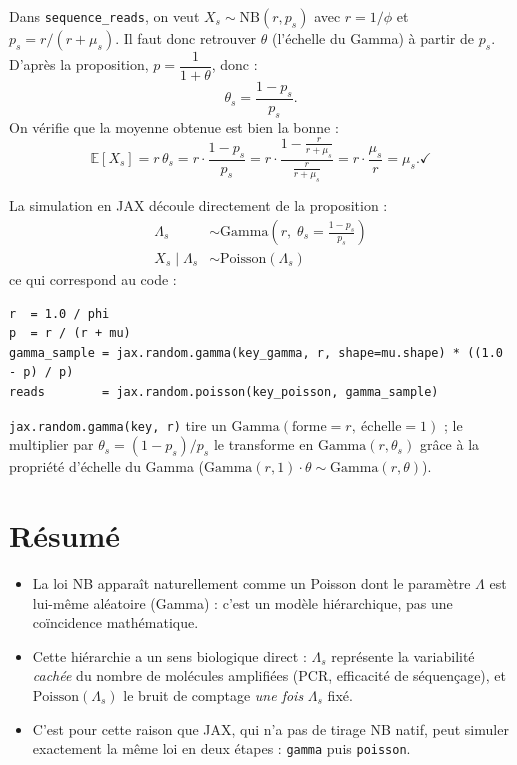 \documentclass[11pt]{article}
\begin{document}
Dans \texttt{sequence\_reads}, on veut $X_s \sim \mathrm{NB}(r, p_s)$ avec $r = 1/\phi$ et
$p_s = r/(r+\mu_s)$. Il faut donc retrouver $\theta$ (l'échelle du Gamma) à partir de $p_s$.
D'après la proposition, $p = \dfrac{1}{1+\theta}$, donc :
\[
  \theta_s = \frac{1-p_s}{p_s}.
\]
On vérifie que la moyenne obtenue est bien la bonne :
\[
  \mathbb{E}[X_s] = r\,\theta_s = r \cdot \frac{1-p_s}{p_s} = r \cdot \frac{1 - \frac{r}{r+\mu_s}}{\frac{r}{r+\mu_s}}
  = r \cdot \frac{\mu_s}{r} = \mu_s. \checkmark
\]

La simulation en JAX découle directement de la proposition :
\begin{align*}
  \Lambda_s &\sim \mathrm{Gamma}\!\left(r,\; \theta_s = \frac{1-p_s}{p_s}\right) \\
  X_s \mid \Lambda_s &\sim \mathrm{Poisson}(\Lambda_s)
\end{align*}
ce qui correspond au code :
\begin{verbatim}
r  = 1.0 / phi
p  = r / (r + mu)
gamma_sample = jax.random.gamma(key_gamma, r, shape=mu.shape) * ((1.0 - p) / p)
reads        = jax.random.poisson(key_poisson, gamma_sample)
\end{verbatim}
\texttt{jax.random.gamma(key, r)} tire un $\mathrm{Gamma}(\text{forme}=r,\ \text{échelle}=1)$ ;
le multiplier par $\theta_s = (1-p_s)/p_s$ le transforme en $\mathrm{Gamma}(r,\theta_s)$ grâce à
la propriété d'échelle du Gamma ($\mathrm{Gamma}(r,1)\cdot\theta \sim \mathrm{Gamma}(r,\theta)$).

\section{Résumé}

\begin{itemize}
  \item La loi NB apparaît naturellement comme un Poisson dont le paramètre $\Lambda$ est
        lui-même aléatoire (Gamma) : c'est un modèle hiérarchique, pas une coïncidence
        mathématique.
  \item Cette hiérarchie a un sens biologique direct : $\Lambda_s$ représente la variabilité
        \emph{cachée} du nombre de molécules amplifiées (PCR, efficacité de séquençage),
        et $\mathrm{Poisson}(\Lambda_s)$ le bruit de comptage \emph{une fois} $\Lambda_s$ fixé.
  \item C'est pour cette raison que JAX, qui n'a pas de tirage NB natif, peut simuler
        exactement la même loi en deux étapes : \texttt{gamma} puis \texttt{poisson}.
\end{itemize}
\end{document}
